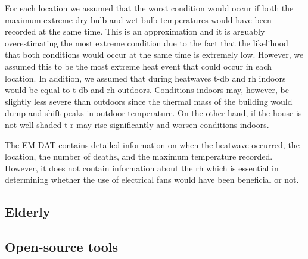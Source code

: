 For each location we assumed that the worst condition would occur if both the maximum extreme dry-bulb and wet-bulb temperatures would have been recorded at the same time.
This is an approximation and it is arguably overestimating the most extreme condition due to the fact that the likelihood that both conditions would occur at the same time is extremely low.
However, we assumed this to be the most extreme heat event that could occur in each location.
In addition, we assumed that during heatwaves \ac{t-db} and \ac{rh} indoors would be equal to \ac{t-db} and \ac{rh} outdoors.
Conditions indoors may, however, be slightly less severe than outdoors since the thermal mass of the building would dump and shift peaks in outdoor temperature.
On the other hand, if the house is not well shaded \ac{t-r} may rise significantly and worsen conditions indoors.

The EM-DAT contains detailed information on when the heatwave occurred, the location, the number of deaths, and the maximum temperature recorded.
However, it does not contain information about the \ac{rh} which is essential in determining whether the use of electrical fans would have been beneficial or not.

\subsection{Elderly}


\subsection{Open-source tools}

